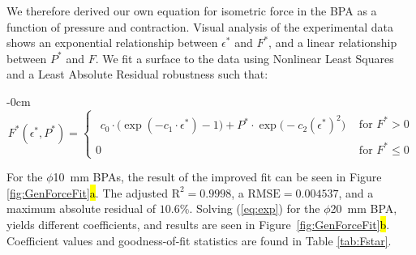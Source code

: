 \documentclass[actuators,article,accept,pdftex,moreauthors]{Definitions/mdpi}
\begin{document}
We therefore derived our own equation for isometric force in the BPA as a function of pressure and contraction. Visual analysis of the experimental data shows an exponential relationship between $\epsilon^*$ and $F^*$, and a linear relationship between $P^*$ and $F$. We fit a surface to the data using Nonlinear Least Squares and a Least Absolute Residual robustness such that:
\begin{adjustwidth}{-\extralength}{0cm}
\begin{equation}
F^*(\epsilon^*,P^*)=
\begin{cases}
\begin{aligned}
c_0\cdot\bigl(\exp(-c_1 \cdot \epsilon^*)-1\bigr)
+ P^*\cdot\exp\!\bigl(-c_2(\epsilon^*)^{2}\bigr)
\end{aligned}
& \text{for } F^*>0\\[10pt]
0
& \text{for } F^*\le 0
\end{cases}\label{eq:exp}
\end{equation}
\end{adjustwidth}

For the $\phi$\qty{10}{\mm} BPAs, the result of the improved fit can be seen in Figure \ref{fig:GenForceFit}\hl{a}. The adjusted $\text{R}^2=0.9998$, a $\text{RMSE}=0.004537$, and a maximum absolute residual of $10.6\%$. Solving (\ref{eq:exp}) for the $\phi$\qty{20}{\mm} BPA, yields different coefficients, and results are seen in \mbox{Figure~\ref{fig:GenForceFit}\hl{b}.} Coefficient values and goodness-of-fit statistics are found in Table \ref{tab:Fstar}. 
\end{document}
